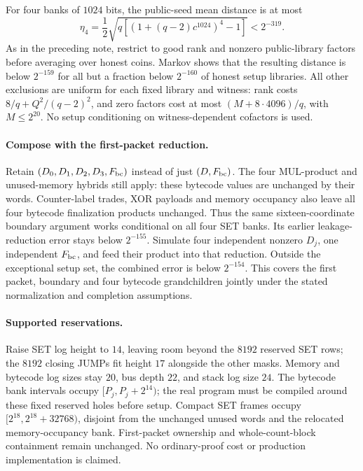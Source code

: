 \documentclass[11pt]{article}
\begin{document}
For four banks of $1024$ bits, the public-seed mean distance is at most
\[
 \eta_4=\frac12\sqrt{q\left[(1+(q-2)c^{1024})^4-1\right]}<2^{-319}.
\]
As in the preceding note, restrict to good rank and nonzero public-library factors before averaging over honest coins. Markov shows that the resulting distance is below $2^{-159}$ for all but a fraction below $2^{-160}$ of honest setup libraries. All other exclusions are uniform for each fixed library and witness: rank costs $8/q+Q^2/(q-2)^2$, and zero factors cost at most $(M+8\cdot4096)/q$, with $M\le2^{20}$. No setup conditioning on witness-dependent cofactors is used.

\paragraph{Compose with the first-packet reduction.} Retain $(D_0,D_1,D_2,D_3,F_{\rm bc})$ instead of just $(D,F_{\rm bc})$. The four MUL-product and unused-memory hybrids still apply: these bytecode values are unchanged by their words. Counter-label trades, XOR payloads and memory occupancy also leave all four bytecode finalization products unchanged. Thus the same sixteen-coordinate boundary argument works conditional on all four SET banks. Its earlier leakage-reduction error stays below $2^{-155}$. Simulate four independent nonzero $D_j$, one independent $F_{\rm bc}$, and feed their product into that reduction. Outside the exceptional setup set, the combined error is below $2^{-154}$. This covers the first packet, boundary and four bytecode grandchildren jointly under the stated normalization and completion assumptions.

\paragraph{Supported reservations.} Raise SET log height to $14$, leaving room beyond the $8192$ reserved SET rows; the $8192$ closing JUMPs fit height $17$ alongside the other masks. Memory and bytecode log sizes stay $20$, bus depth $22$, and stack log size $24$. The bytecode bank intervals occupy $[P_j,P_j+2^{14})$; the real program must be compiled around these fixed reserved holes before setup. Compact SET frames occupy $[2^{18},2^{18}+32768)$, disjoint from the unchanged unused words and the relocated memory-occupancy bank. First-packet ownership and whole-count-block containment remain unchanged. No ordinary-proof cost or production implementation is claimed.
\end{document}
